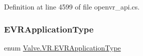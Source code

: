 Definition at line 4599 of file openvr\+\_\+api.\+cs.

\mbox{\label{namespace_valve_1_1_v_r_a75c95b1b332a3c064198f2eac92ffe07}} 
\subsubsection{\texorpdfstring{EVRApplicationType}{EVRApplicationType}}
{\footnotesize\ttfamily enum \mbox{\hyperlink{namespace_valve_1_1_v_r_a75c95b1b332a3c064198f2eac92ffe07}{Valve.\+V\+R.\+E\+V\+R\+Application\+Type}}\hspace{0.3cm}{\ttfamily [strong]}}

